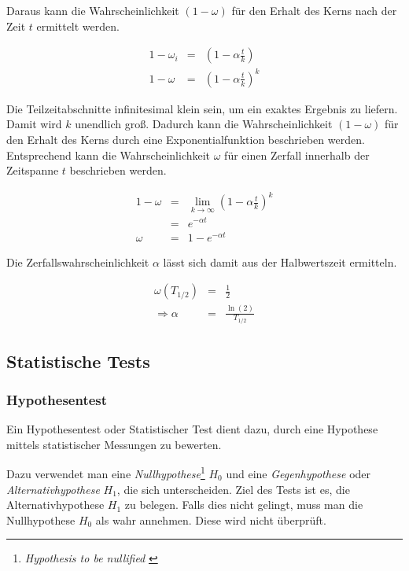 \documentclass[12pt,a4paper]{scrartcl}
\numberwithin{equation}{section} %
\begin{document}
Daraus kann die Wahrscheinlichkeit $(1 - \omega)$ für den Erhalt des Kerns nach der Zeit $t$ ermittelt werden.

\begin{eqnarray}
	1 - \omega_i &=& \left(1 - \alpha \frac{t}{k}\right) \\
	1 - \omega &=& \left(1 - \alpha \frac{t}{k} \right)^k
\end{eqnarray}

\noindent
Die Teilzeitabschnitte infinitesimal klein sein, um ein exaktes Ergebnis zu liefern. Damit wird $k$ unendlich groß. Dadurch kann die Wahrscheinlichkeit $(1-\omega)$ für den Erhalt des Kerns durch eine Exponentialfunktion beschrieben werden. Entsprechend kann die Wahrscheinlichkeit $\omega$ für einen Zerfall innerhalb der Zeitspanne $t$ beschrieben werden.

\begin{eqnarray}
	1 - \omega &=& \lim_{k \rightarrow \infty} \left(1 - \alpha \frac{t}{k} \right)^k \\
		&=& e^{- \alpha t} \\
	\omega &=& 1 - e^{-\alpha t}
\end{eqnarray}

\noindent
Die Zerfallswahrscheinlichkeit $\alpha$ lässt sich damit aus der Halbwertszeit ermitteln.

\begin{eqnarray}
	\omega(T_{1/2}) &=& \frac{1}{2} \\
	\Rightarrow\alpha &=& \frac{\ln{(2)}}{T_{1/2}}
\end{eqnarray}

\hypertarget{statistische-tests}{%
\subsection{Statistische Tests}\label{statistische-tests}}

\hypertarget{hypothesentest}{%
\subsubsection{Hypothesentest}\label{hypothesentest}}

Ein Hypothesentest oder Statistischer Test dient dazu, durch eine Hypothese mittels statistischer Messungen zu bewerten.

Dazu verwendet man eine \emph{Nullhypothese}\footnote{\emph{Hypothesis  to be nullified} \cite{Gigerenzer}} $H_0$ und eine \emph{Gegenhypothese} oder \emph{Alternativhypothese} $H_1$, die sich unterscheiden. Ziel des Tests ist es, die Alternativhypothese $H_1$ zu belegen. Falls dies nicht gelingt, muss man die Nullhypothese $H_0$ als wahr annehmen. Diese wird nicht überprüft. \cite{Statistical Inference}
\end{document}

